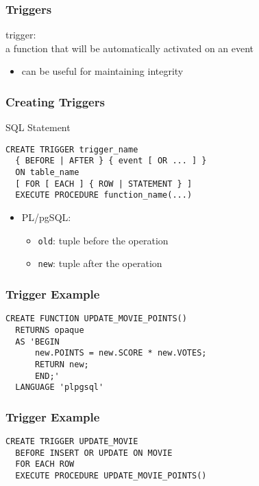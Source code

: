 \documentclass[dvipsnames]{beamer}
\theoremstyle{plain}
\begin{document}
\begin{frame}
  \frametitle{Triggers}

  \begin{definition}
    \alert{trigger}:\\
      a function that will be automatically activated on an event
  \end{definition}

  \begin{itemize}
    \item can be useful for maintaining integrity
  \end{itemize}
\end{frame}

\begin{frame}[fragile]
  \frametitle{Creating Triggers}

  \begin{block}{SQL Statement}
    \begin{lstlisting}[language=ExtendedSQL]
CREATE TRIGGER trigger_name
  { BEFORE | AFTER } { event [ OR ... ] }
  ON table_name
  [ FOR [ EACH ] { ROW | STATEMENT } ]
  EXECUTE PROCEDURE function_name(...)
    \end{lstlisting}
  \end{block}

  \pause
  \begin{itemize}
    \item PL/pgSQL:
    \begin{itemize}
      \item \lstinline!old!: tuple before the operation
      \item \lstinline!new!: tuple after the operation
    \end{itemize}
  \end{itemize}
\end{frame}

\begin{frame}[fragile]
  \frametitle{Trigger Example}

  \begin{example}
    \begin{lstlisting}[language=ExtendedSQL]
CREATE FUNCTION UPDATE_MOVIE_POINTS()
  RETURNS opaque
  AS 'BEGIN
      new.POINTS = new.SCORE * new.VOTES;
      RETURN new;
      END;'
  LANGUAGE 'plpgsql'
    \end{lstlisting}
  \end{example}
\end{frame}

\begin{frame}[fragile]
  \frametitle{Trigger Example}

  \begin{example}
    \begin{lstlisting}[language=ExtendedSQL]
CREATE TRIGGER UPDATE_MOVIE
  BEFORE INSERT OR UPDATE ON MOVIE
  FOR EACH ROW
  EXECUTE PROCEDURE UPDATE_MOVIE_POINTS()
    \end{lstlisting}
  \end{example}
\end{frame}
\end{document}
